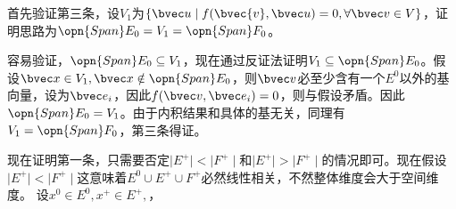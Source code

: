 首先验证第三条，设$V_1$为$\{\bvec u\mid f(\bvec{v},\bvec u)=0,\forall \bvec v\in V\}$，证明思路为$\opn{Span}E_0=V_1=\opn{Span}F_0$。

容易验证，$\opn{Span}E_0\subseteq V_1$，现在通过反证法证明$ V_1\subseteq \opn{Span}E_0$。假设$\bvec x\in V_1,\bvec x\notin \opn{Span}E_0$，则$\bvec v$必至少含有一个$E^0$以外的基向量，设为$\bvec e_i$，因此$f(\bvec v,\bvec e_i)=0$，则与假设矛盾。因此$\opn{Span}E_0=V_1$。由于内积结果和具体的基无关，同理有$V_1=\opn{Span}F_0$，第三条得证。

现在证明第一条，只需要否定$\mid E^{+}\mid<\mid F^{+}\mid$和$\mid E^{+}\mid>\mid F^{+}\mid$的情况即可。现在假设$\mid E^{+}\mid<\mid F^{+}\mid$这意味着$E^0\cup E^{+} \cup F^{+}$必然线性相关，不然整体维度会大于空间维度。
设$x^0\in E^0,x^+\in E^{+},$，

